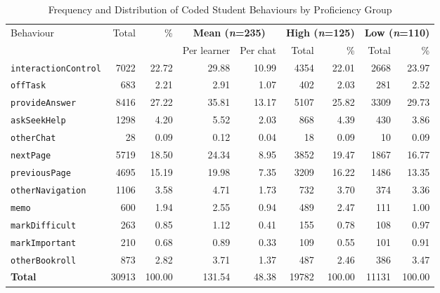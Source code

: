 \begin{table}[ht!]
  \centering
  \caption{Frequency and Distribution of Coded Student Behaviours by Proficiency Group}
  \label{table:student_behaviours}
  \begin{tabular}{p{3.2cm} r r r r r r r r}
    \toprule
    \multirow{2}{*}{\parbox{3.2cm}{\centering Behaviour}} & 
    \multirow{2}{*}{\parbox{1.1cm}{\centering Total}} & 
    \multirow{2}{*}{\parbox{1.1cm}{\centering \%}} &
    \multicolumn{2}{c}{\textbf{Mean (\textit{n}=235)}} & 
    \multicolumn{2}{c}{\textbf{High (\textit{n}=125)}} & 
    \multicolumn{2}{c}{\textbf{Low (\textit{n}=110)}} \\ 
    \cmidrule(lr){4-5} \cmidrule(lr){6-7} \cmidrule(lr){8-9}
    & & & Per learner & Per chat & Total & \% & Total & \% \\
    \midrule
    \texttt{interactionControl} & 7022 & 22.72 & 29.88 & 10.99 & 4354 & 22.01 & 2668 & 23.97 \\
    \texttt{offTask}            & 683  & 2.21  & 2.91  & 1.07  & 402  & 2.03  & 281  & 2.52  \\
    \texttt{provideAnswer}      & 8416 & 27.22 & 35.81 & 13.17 & 5107 & 25.82 & 3309 & 29.73 \\
    \texttt{askSeekHelp}        & 1298 & 4.20  & 5.52  & 2.03  & 868  & 4.39  & 430  & 3.86  \\
    \texttt{otherChat}          & 28   & 0.09  & 0.12  & 0.04  & 18   & 0.09  & 10   & 0.09  \\
    \texttt{nextPage}           & 5719 & 18.50 & 24.34 & 8.95  & 3852 & 19.47 & 1867 & 16.77 \\
    \texttt{previousPage}       & 4695 & 15.19 & 19.98 & 7.35  & 3209 & 16.22 & 1486 & 13.35 \\
    \texttt{otherNavigation}    & 1106 & 3.58  & 4.71  & 1.73  & 732  & 3.70  & 374  & 3.36  \\
    \texttt{memo}               & 600  & 1.94  & 2.55  & 0.94  & 489  & 2.47  & 111  & 1.00  \\
    \texttt{markDifficult}      & 263  & 0.85  & 1.12  & 0.41  & 155  & 0.78  & 108  & 0.97  \\
    \texttt{markImportant}      & 210  & 0.68  & 0.89  & 0.33  & 109  & 0.55  & 101  & 0.91  \\
    \texttt{otherBookroll}      & 873  & 2.82  & 3.71  & 1.37  & 487  & 2.46  & 386  & 3.47  \\
    \textbf{Total}              & 30913 & 100.00 & 131.54 & 48.38 & 19782 & 100.00 & 11131 & 100.00 \\
    \bottomrule
  \end{tabular}
\end{table}
